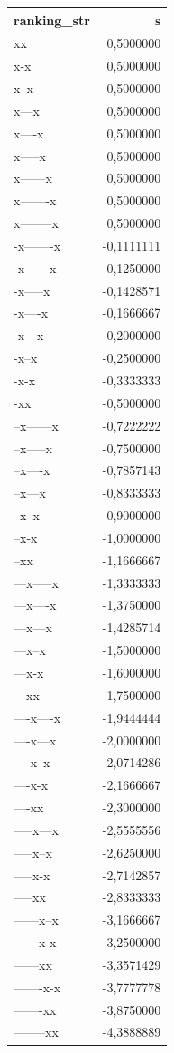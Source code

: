 \documentclass[
  letterpaper,
  DIV=11,
  numbers=noendperiod]{scrreprt}
\begin{document}
\begin{longtable*}{lr}
\toprule
ranking\_str & s \\ 
\midrule\addlinespace[2.5pt]
xx & 0,5000000 \\ 
x-x & 0,5000000 \\ 
x--x & 0,5000000 \\ 
x---x & 0,5000000 \\ 
x----x & 0,5000000 \\ 
x-----x & 0,5000000 \\ 
x------x & 0,5000000 \\ 
x-------x & 0,5000000 \\ 
x--------x & 0,5000000 \\ 
-x-------x & -0,1111111 \\ 
-x------x & -0,1250000 \\ 
-x-----x & -0,1428571 \\ 
-x----x & -0,1666667 \\ 
-x---x & -0,2000000 \\ 
-x--x & -0,2500000 \\ 
-x-x & -0,3333333 \\ 
-xx & -0,5000000 \\ 
--x------x & -0,7222222 \\ 
--x-----x & -0,7500000 \\ 
--x----x & -0,7857143 \\ 
--x---x & -0,8333333 \\ 
--x--x & -0,9000000 \\ 
--x-x & -1,0000000 \\ 
--xx & -1,1666667 \\ 
---x-----x & -1,3333333 \\ 
---x----x & -1,3750000 \\ 
---x---x & -1,4285714 \\ 
---x--x & -1,5000000 \\ 
---x-x & -1,6000000 \\ 
---xx & -1,7500000 \\ 
----x----x & -1,9444444 \\ 
----x---x & -2,0000000 \\ 
----x--x & -2,0714286 \\ 
----x-x & -2,1666667 \\ 
----xx & -2,3000000 \\ 
-----x---x & -2,5555556 \\ 
-----x--x & -2,6250000 \\ 
-----x-x & -2,7142857 \\ 
-----xx & -2,8333333 \\ 
------x--x & -3,1666667 \\ 
------x-x & -3,2500000 \\ 
------xx & -3,3571429 \\ 
-------x-x & -3,7777778 \\ 
-------xx & -3,8750000 \\ 
--------xx & -4,3888889 \\ 
\bottomrule
\end{longtable*}
\end{document}
